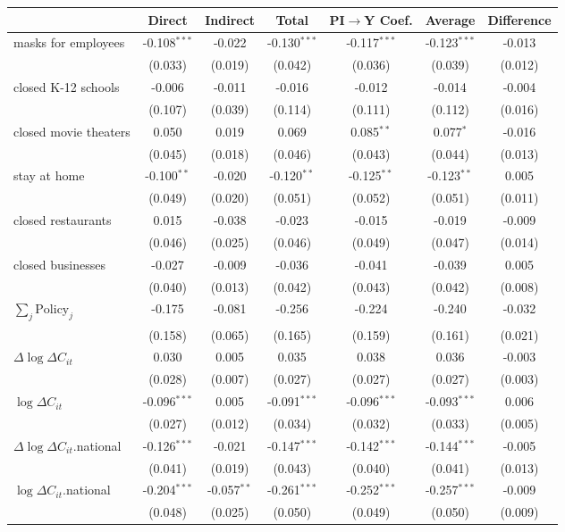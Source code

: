 
\begin{tabular}{lccccc|>{}c}
\toprule
  & Direct & Indirect & Total & PI$\to$Y Coef. & Average & Difference\\
\midrule
masks for employees & -0.108$^{***}$ & -0.022 & -0.130$^{***}$ & -0.117$^{***}$ & -0.123$^{***}$ & -0.013\\
 & (0.033) & (0.019) & (0.042) & (0.036) & (0.039) & (0.012)\\
closed K-12 schools & -0.006 & -0.011 & -0.016 & -0.012 & -0.014 & -0.004\\
 & (0.107) & (0.039) & (0.114) & (0.111) & (0.112) & (0.016)\\
closed movie theaters & 0.050 & 0.019 & 0.069 & 0.085$^{**}$ & 0.077$^{*}$ & -0.016\\
 & (0.045) & (0.018) & (0.046) & (0.043) & (0.044) & (0.013)\\
stay at home & -0.100$^{**}$ & -0.020 & -0.120$^{**}$ & -0.125$^{**}$ & -0.123$^{**}$ & 0.005\\
 & (0.049) & (0.020) & (0.051) & (0.052) & (0.051) & (0.011)\\
closed restaurants & 0.015 & -0.038 & -0.023 & -0.015 & -0.019 & -0.009\\
 & (0.046) & (0.025) & (0.046) & (0.049) & (0.047) & (0.014)\\
closed businesses & -0.027 & -0.009 & -0.036 & -0.041 & -0.039 & 0.005\\
 & (0.040) & (0.013) & (0.042) & (0.043) & (0.042) & (0.008)\\
$\sum_j \mathrm{Policy}_j$ & -0.175 & -0.081 & -0.256 & -0.224 & -0.240 & -0.032\\
 & (0.158) & (0.065) & (0.165) & (0.159) & (0.161) & (0.021)\\
$\Delta \log \Delta C_{it}$ & 0.030 & 0.005 & 0.035 & 0.038 & 0.036 & -0.003\\
 & (0.028) & (0.007) & (0.027) & (0.027) & (0.027) & (0.003)\\
$\log \Delta C_{it}$ & -0.096$^{***}$ & 0.005 & -0.091$^{***}$ & -0.096$^{***}$ & -0.093$^{***}$ & 0.006\\
 & (0.027) & (0.012) & (0.034) & (0.032) & (0.033) & (0.005)\\
$\Delta \log \Delta C_{it}$.national & -0.126$^{***}$ & -0.021 & -0.147$^{***}$ & -0.142$^{***}$ & -0.144$^{***}$ & -0.005\\
 & (0.041) & (0.019) & (0.043) & (0.040) & (0.041) & (0.013)\\
$\log \Delta C_{it}$.national & -0.204$^{***}$ & -0.057$^{**}$ & -0.261$^{***}$ & -0.252$^{***}$ & -0.257$^{***}$ & -0.009\\
 & (0.048) & (0.025) & (0.050) & (0.049) & (0.050) & (0.009)\\
\bottomrule
\end{tabular}